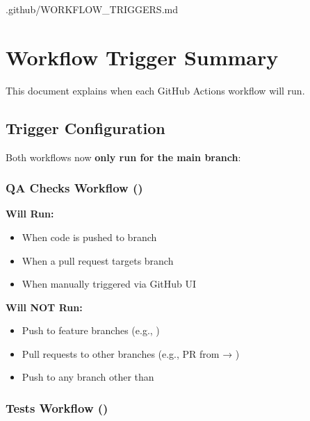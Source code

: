 \begin{relocated}{.github/WORKFLOW_TRIGGERS.md}
\section{Workflow Trigger Summary}\label{um:flow:workflow-triggers}

This document explains when each GitHub Actions workflow will run.

\subsection{Trigger Configuration}\label{um:flow:workflow-triggers:trigger-configuration}

Both workflows now \textbf{only run for the main branch}:

\subsubsection{\texorpdfstring{QA Checks Workflow
()}{QA Checks Workflow ()}}\label{um:flow:workflow-triggers:qa-checks-workflow-qa-checksyml}

\textbf{\ok{} Will Run:}

\begin{itemize}
\tightlist
\item
  When code is pushed to  branch
\item
  When a pull request targets  branch
\item
  When manually triggered via GitHub UI
\end{itemize}

\textbf{\bad{} Will NOT Run:}

\begin{itemize}
\tightlist
\item
  Push to feature branches (e.g., )
\item
  Pull requests to other branches (e.g., PR from  →
  )
\item
  Push to any branch other than 
\end{itemize}

\subsubsection{\texorpdfstring{Tests Workflow
()}{Tests Workflow ()}}\label{um:flow:workflow-triggers:tests-workflow-testsyml}


\end{relocated}
